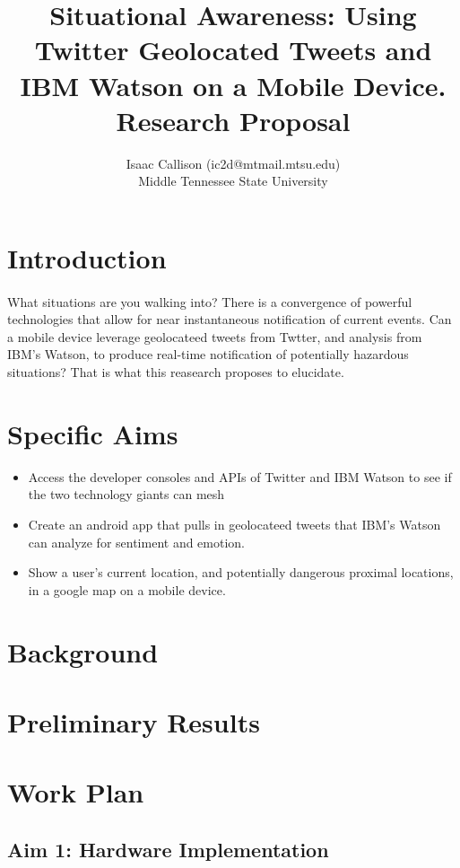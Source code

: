 \documentclass[12pt, oneside]{article}
\title{Situational Awareness: Using Twitter Geolocated Tweets and IBM Watson on a Mobile Device.
\\\medskip Research Proposal}
\author{Isaac Callison (ic2d@mtmail.mtsu.edu)\\Middle Tennessee State University}
\begin{document}
\maketitle
\nocite{*}

\section{Introduction}
\paragraph{}
What situations are you walking into? There is a convergence of powerful technologies that allow for near instantaneous notification of current events.
Can a mobile device leverage geolocateed tweets from Twtter, and analysis from IBM's Watson, to produce real-time notification of potentially hazardous situations? That is what this reasearch proposes to elucidate.

\section{Specific Aims}
\begin{itemize}
 \item Access the developer consoles and APIs of Twitter and IBM Watson to see
 if the two technology giants can mesh

 \item Create an android app that pulls in geolocateed tweets that IBM's Watson can analyze for sentiment and emotion.

 \item Show a user's current location, and potentially dangerous proximal locations, in a google map on a mobile device. 

\end{itemize}

\section{Background}

\section{Preliminary Results}

\section{Work Plan}


\subsection{Aim 1: Hardware Implementation}
\end{document}
